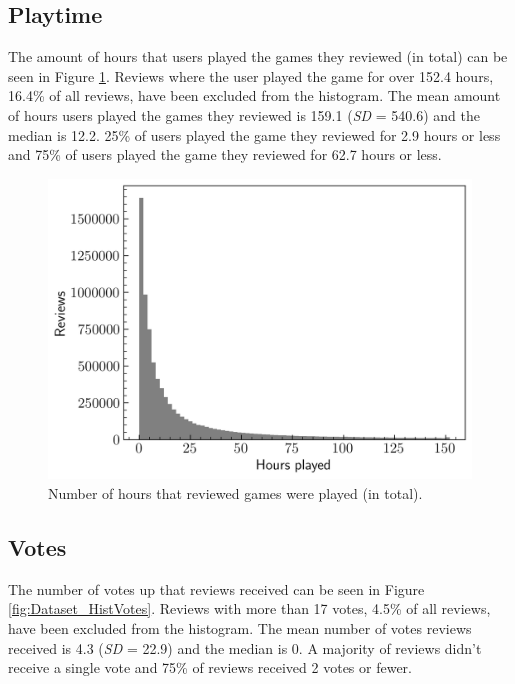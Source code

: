 \subsection{Playtime}

The amount of hours that users played the games they reviewed (in total) can be seen in Figure \ref{fig:Dataset_HistPlaytimes}. Reviews where the user played the game for over 152.4 hours, 16.4\% of all reviews, have been excluded from the histogram. The mean amount of hours users played the games they reviewed is 159.1 (\textit{SD} = 540.6) and the median is 12.2. 25\% of users played the game they reviewed for 2.9 hours or less and 75\% of users played the game they reviewed for 62.7 hours or less.

\begin{figure}[ht]
    \centering
    \includegraphics[scale=0.55]{figures/03_dataset/10_hist_review_playtimes.png}
    \caption{Number of hours that reviewed games were played (in total).}
    \label{fig:Dataset_HistPlaytimes}
\end{figure}

\subsection{Votes}

The number of votes up that reviews received can be seen in Figure \ref{fig:Dataset_HistVotes}. Reviews with more than 17 votes, 4.5\% of all reviews, have been excluded from the histogram. The mean number of votes reviews received is 4.3 (\textit{SD} = 22.9) and the median is 0. A majority of reviews didn't receive a single vote and 75\% of reviews received 2 votes or fewer.

